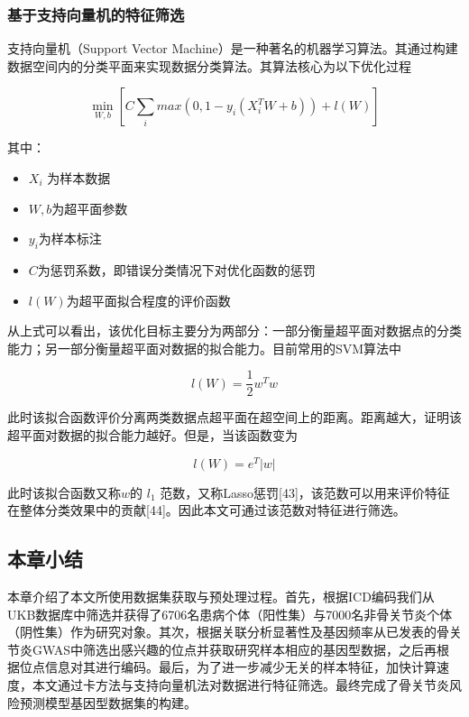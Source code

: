 \documentclass[
]{article}
\begin{document}
\hypertarget{ux57faux4e8eux652fux6301ux5411ux91cfux673aux7684ux7279ux5f81ux7b5bux9009}{%
\subsubsection{基于支持向量机的特征筛选}\label{ux57faux4e8eux652fux6301ux5411ux91cfux673aux7684ux7279ux5f81ux7b5bux9009}}

支持向量机（Support Vector
Machine）是一种著名的机器学习算法。其通过构建数据空间内的分类平面来实现数据分类算法。其算法核心为以下优化过程

\[\min_{W,b} [C\sum_{i}max(0,1-y_i(X_i^TW+b))+l(W)]\]

其中：

\begin{itemize}
\item
  \(X_i\) 为样本数据
\item
  \(W,b\)为超平面参数
\item
  \(y_i\)为样本标注
\item
  \(C\)为惩罚系数，即错误分类情况下对优化函数的惩罚
\item
  \(l(W)\)为超平面拟合程度的评价函数
\end{itemize}

从上式可以看出，该优化目标主要分为两部分：一部分衡量超平面对数据点的分类能力；另一部分衡量超平面对数据的拟合能力。目前常用的SVM算法中

\[l(W)=\frac{1}{2}w^Tw\]

此时该拟合函数评价分离两类数据点超平面在超空间上的距离。距离越大，证明该超平面对数据的拟合能力越好。但是，当该函数变为

\[l(W)=e^T|w|\]

此时该拟合函数又称\(w\)的 \(l_1\)
范数，又称Lasso惩罚{[}43{]}，该范数可以用来评价特征在整体分类效果中的贡献{[}44{]}。因此本文可通过该范数对特征进行筛选。

\hypertarget{ux672cux7ae0ux5c0fux7ed3-1}{%
\subsection{本章小结}\label{ux672cux7ae0ux5c0fux7ed3-1}}

本章介绍了本文所使用数据集获取与预处理过程。首先，根据ICD编码我们从UKB数据库中筛选并获得了6706名患病个体（阳性集）与7000名非骨关节炎个体（阴性集）作为研究对象。其次，根据关联分析显著性及基因频率从已发表的骨关节炎GWAS中筛选出感兴趣的位点并获取研究样本相应的基因型数据，之后再根据位点信息对其进行编码。最后，为了进一步减少无关的样本特征，加快计算速度，本文通过卡方法与支持向量机法对数据进行特征筛选。最终完成了骨关节炎风险预测模型基因型数据集的构建。
\end{document}
